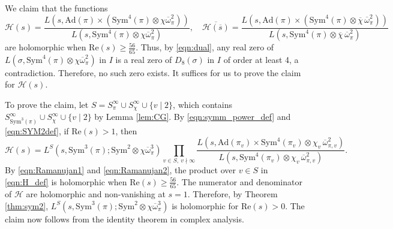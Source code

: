 \documentclass[11pt]{amsart}
\theoremstyle{remark}
\numberwithin{equation}{section}
\begin{document}
We claim that the functions
\[
\mathcal{H}(s)=\frac{L(s,\mathrm{Ad}(\pi)\times(\mathrm{Sym}^4(\pi)\otimes\chi\overline{\omega}_{\pi}^{2}))}{L(s,\mathrm{Sym}^4(\pi)\otimes\chi\overline{\omega}_{\pi}^{2})},\quad \overline{\mathcal{H}(\overline{s})}=\frac{L(s,\mathrm{Ad}(\pi)\times(\mathrm{Sym}^4(\pi)\otimes\overline{\chi}\,\overline{\omega}_{\pi}^{2}))}{L(s,\mathrm{Sym}^4(\pi)\otimes\overline{\chi}\,\overline{\omega}_{\pi}^{2})}
\]
are holomorphic when $\mathrm{Re}(s)\geq \frac{56}{65}$.  Thus, by \eqref{eqn:dual}, any real zero of $L(\sigma,\mathrm{Sym}^4(\pi)\otimes\chi\overline{\omega}_{\pi}^{2})$ in $I$ is a real zero of $D_8(\sigma)$ in $I$ of order at least 4, a contradiction.  Therefore, no such zero exists.  It suffices for us to prove the claim for $\mathcal{H}(s)$.

To prove the claim, let $S=S_{\pi}^{\infty}\cup S_{\chi}^{\infty}\cup\{v\mid 2\}$, which contains $S_{\mathrm{Sym}^3(\pi)}^{\infty}\cup S_{\chi}^{\infty}\cup\{v\mid 2\}$ by Lemma \ref{lem:CG}.  By \eqref{eqn:symm_power_def} and \eqref{eqn:SYM2def}, if $\mathrm{Re}(s)>1$, then
\begin{equation}
\label{eqn:H_def}
\mathcal{H}(s)=L^{S}(s,\mathrm{Sym}^3(\pi);\mathrm{Sym}^2\otimes\chi\overline{\omega}_{\pi}^{3})\prod_{v\in S,~v\nmid\infty} \frac{L(s,\mathrm{Ad}(\pi_v) \times\mathrm{Sym}^4(\pi_v)\otimes\chi_v\,\overline{\omega}_{\pi,v}^{2})}{L(s,\mathrm{Sym}^4(\pi_v)\otimes\chi_v\,\overline{\omega}_{\pi,v}^{2})}.
\end{equation}
By \eqref{eqn:Ramanujan1} and \eqref{eqn:Ramanujan2}, the product over $v\in S$ in \eqref{eqn:H_def} is holomorphic when $\mathrm{Re}(s)\geq \frac{56}{65}$.  The numerator and denominator of $\mathcal{H}$ are holomorphic and non-vanishing at $s=1$.  Therefore, by Theorem \ref{thm:sym2}, $L^S(s,\mathrm{Sym}^3(\pi);\mathrm{Sym}^2\otimes\chi\overline{\omega}_{\pi}^3)$ is holomorphic for $\mathrm{Re}(s)>0$.  The claim now follows from the identity theorem in complex analysis.



\end{document}
